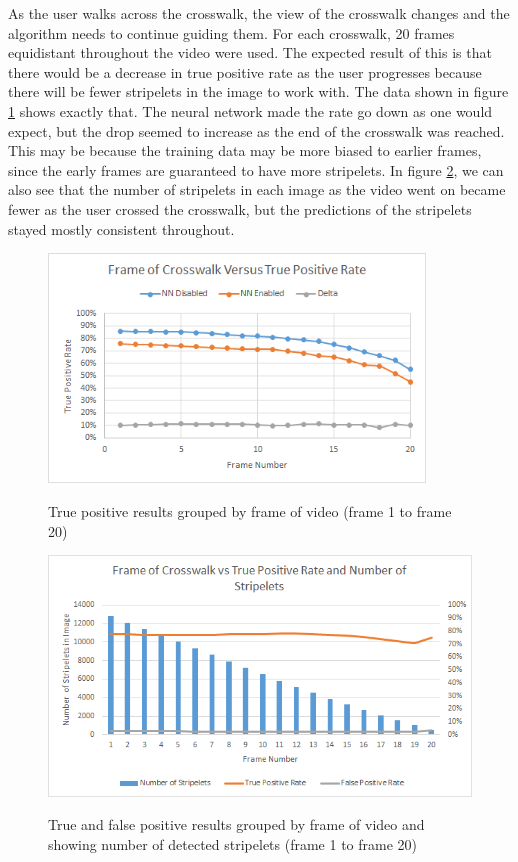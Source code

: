 \documentclass[12pt]{ucthesis}
\newcommand{\captionfonts}{\small\bf\ssp}
\begin{document}
As the user walks across the crosswalk, the view of the crosswalk changes and the algorithm needs to continue guiding them. For each crosswalk, 20 frames equidistant throughout the video were used. The expected result of this is that there would be a decrease in true positive rate as the user progresses because there will be fewer stripelets in the image to work with. The data shown in figure \ref{fig:graphOfFrameCount} shows exactly that. The neural network made the rate go down as one would expect, but the drop seemed to increase as the end of the crosswalk was reached. This may be because the training data may be more biased to earlier frames, since the early frames are guaranteed to have more stripelets. In figure \ref{fig:NumStripeletsvsRates}, we can also see that the number of stripelets in each image as the video went on became fewer as the user crossed the crosswalk, but the predictions of the stripelets stayed mostly consistent throughout. 

\begin{figure}[t]
\begin{center}
\includegraphics[width=10cm]{FrameResultsGraph.png}
\captionfonts
\caption[Neural Network True Positives Grouped by Frame of Video]{True positive results grouped by frame of video (frame 1 to frame 20)}
\label{fig:graphOfFrameCount}
\end{center}
\end{figure}

\begin{figure}[t]
\begin{center}
\includegraphics[width=12cm]{NumStripeletsvsRates.png}
\captionfonts
\caption[True and False Positives Grouped by Frame of Video and Number of Stripelets]{True and false positive results grouped by frame of video and showing number of detected stripelets (frame 1 to frame 20)}
\label{fig:NumStripeletsvsRates}
\end{center}
\end{figure}
\end{document}
